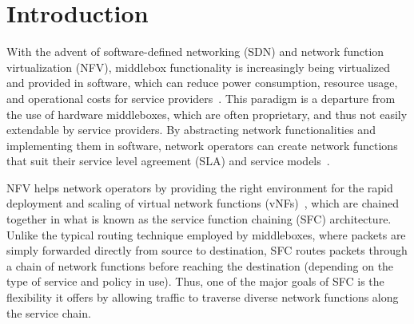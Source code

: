 \documentclass[futureinternet,review,accept,pdftex,moreauthors]{Definitions/mdpi}
\begin{document}



\section{Introduction}
\label{sec:introduction}
With the advent of software-defined networking (SDN) and network function virtualization (NFV), middlebox functionality is increasingly being virtualized and provided in software, which can reduce power consumption, resource usage, and operational costs for service providers~\cite{herrera2016resource, cherrared2019survey}. This paradigm is a departure from the use of hardware middleboxes, which are often proprietary,  and thus not easily extendable by service providers. By abstracting network functionalities and implementing them in software, network operators can create network functions that suit their service level agreement (SLA) and service models~\cite{paganelli2021tenant}. 

NFV helps network operators by providing the right environment for the rapid deployment and scaling of virtual network functions (vNFs)~\cite{laghrissi2018survey},  which are chained together in what is known as the service function chaining (SFC) architecture. Unlike the typical routing technique employed by middleboxes, where packets are simply forwarded directly from source to destination, SFC routes packets through a chain of network functions before reaching the destination (depending on the type of service and policy in use). Thus, one of the major goals of SFC is the flexibility it offers by allowing traffic to traverse diverse network functions along the service chain. 
\end{document}
